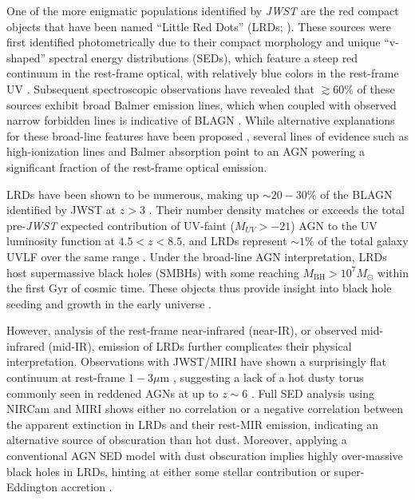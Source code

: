 \documentclass[twocolumn]{aastex7}
\begin{document}
One of the more enigmatic populations identified by \textit{JWST} are the red compact objects that have been named ``Little Red Dots'' (LRDs; \citealt{matthee24}).  These sources were first identified photometrically due to their compact morphology and unique ``v-shaped'' spectral energy distributions (SEDs), which feature a steep red continuum in the rest-frame optical, with relatively blue colors in the rest-frame UV \citep{kocevski23,Barro23,labbe23}.  Subsequent spectroscopic observations have revealed that $\gtrsim60\%$ of these sources exhibit broad Balmer emission lines, which when coupled with observed narrow forbidden lines is indicative of BLAGN \citep{kocevski23,kokorev23,furtak24,greene24,matthee24,kocevski25}. While alternative explanations for these broad-line features have been proposed \citep[e.g.,][]{Baggen24}, several lines of evidence such as high-ionization lines \citep{labbe24, tripodi24, akins25} and Balmer absorption \citep{matthee24,ji25} point to an AGN powering a significant fraction of the rest-frame optical emission.

LRDs have been shown to be numerous, making up $\sim20-30\%$ of the BLAGN identified by JWST at $z>3$ \citep{harikane23,greene24,maiolino24,taylor24}. Their number density matches or exceeds the total pre-\textit{JWST} expected contribution of UV-faint ($M_{UV}>-21$) AGN to the UV luminosity function at $4.5<z<8.5$, and LRDs represent $\sim1\%$ of the total galaxy UVLF over the same range \citep{finkelsteinbagley22,kokorev24,kocevski25,taylor24}. Under the broad-line AGN interpretation, LRDs host supermassive black holes (SMBHs) with some reaching $M_{\textrm{BH}}> 10^7 M_{\odot}$ within the first Gyr of cosmic time. These objects thus provide insight into black hole seeding and growth in the early universe \citep[e.g.,][]{Smith2019,Woods2019,Inayoshi2020,Regan2024,Jeon_SMBH2025}. 

However, analysis of the rest-frame near-infrared (near-IR), or observed mid-infrared (mid-IR), emission of LRDs further complicates their physical interpretation. Observations with JWST/MIRI have shown a surprisingly flat continuum at rest-frame $1-3 \mu$m \citep[e.g.,][]{Williams24, PerezGonzalez24, akins24, leung24, barro24b}, suggesting a lack of a hot dusty torus commonly seen in reddened AGNs at up to $z \sim 6$ \citep[e.g.,][]{barvainis87, lyu22}. Full SED analysis using NIRCam and MIRI shows either no correlation \citep{leung24} or a negative correlation \citep{barro24b} between the apparent extinction in LRDs and their rest-MIR emission, indicating an alternative source of obscuration than hot dust. Moreover, applying a conventional AGN SED model with dust obscuration implies highly over-massive black holes in LRDs, hinting at either some stellar contribution or super-Eddington accretion \citep{leung24}.
\end{document}
